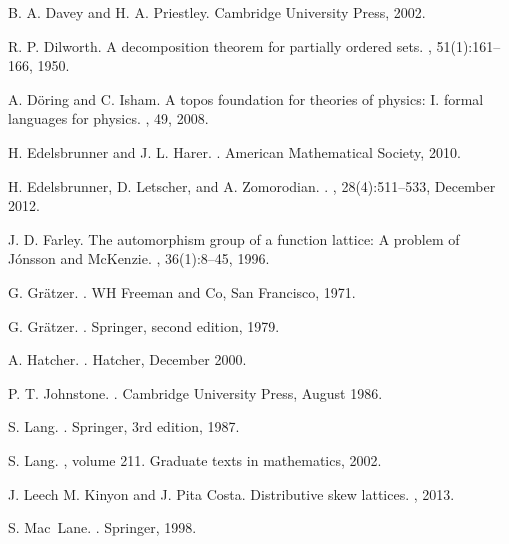 \documentclass[10pt]{amsart}
\begin{document}
\begin{thebibliography}{10}
B. A. Davey and H. A. Priestley.
\newblock Cambridge University Press, 2002.

R. P. Dilworth.
\newblock A decomposition theorem for partially ordered sets.
, 51(1):161--166, 1950.

A. D\"{o}ring and C. Isham.
\newblock A topos foundation for theories of physics: I. formal languages for
  physics.
, 49, 2008.

H. Edelsbrunner and J. L. Harer.
.
\newblock American Mathematical Society, 2010.

H. Edelsbrunner, D. Letscher, and A. Zomorodian.
.
, 28(4):511--533, December
  2012.

J. D. Farley.
\newblock The automorphism group of a function lattice: A problem of J\' onsson
  and McKenzie.
, 36(1):8--45, 1996.

G. Gr\"{a}tzer.
.
\newblock WH Freeman and Co, San Francisco, 1971.

G. Gr\"{a}tzer.
.
\newblock Springer, second edition, 1979.

A. Hatcher.
.
\newblock Hatcher, December 2000.

P. T. Johnstone.
.
\newblock Cambridge University Press, August 1986.

S. Lang.
.
\newblock Springer, 3rd edition, 1987.

S. Lang.
, volume 211.
\newblock Graduate texts in mathematics, 2002.


J. Leech M. Kinyon and J. Pita Costa.
\newblock Distributive skew lattices.
, 2013.

S. Mac~Lane.
.
\newblock Springer, 1998.


\end{thebibliography}
\end{document}
